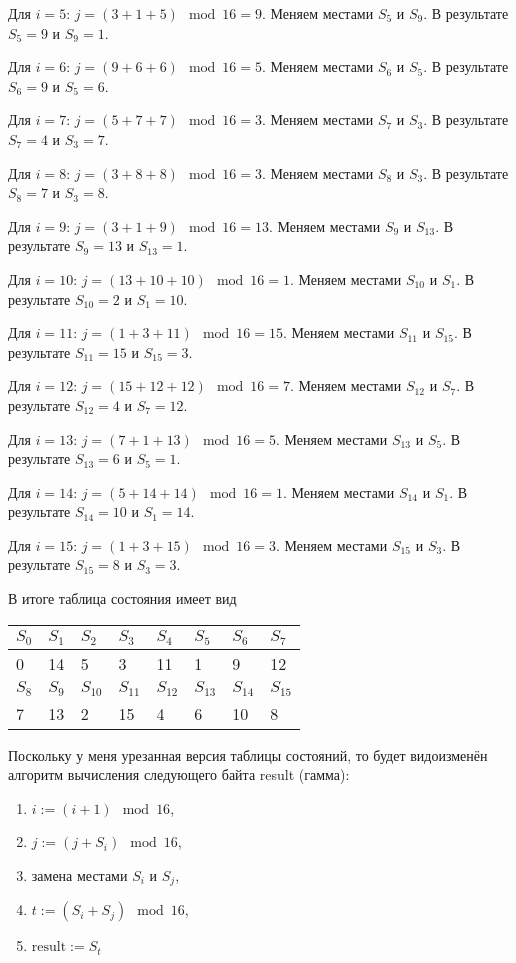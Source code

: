 \documentclass[10pt]{article}
\begin{document}
Для $i = 5$: $j = (3 + 1 + 5) \mod 16 = 9$. Меняем местами $S_5$ и $S_{9}$. В результате $S_5 = 9$ и $S_{9} = 1$.

Для $i = 6$: $j = (9 + 6 + 6) \mod 16 = 5$. Меняем местами $S_6$ и $S_{5}$. В результате $S_6 = 9$ и $S_{5} = 6$.

Для $i = 7$: $j = (5 + 7 + 7) \mod 16 = 3$. Меняем местами $S_7$ и $S_{3}$. В результате $S_7 = 4$ и $S_{3} = 7$.

Для $i = 8$: $j = (3 + 8 + 8) \mod 16 = 3$. Меняем местами $S_8$ и $S_{3}$. В результате $S_8 = 7$ и $S_{3} = 8$.

Для $i = 9$: $j = (3 + 1 + 9) \mod 16 = 13$. Меняем местами $S_9$ и $S_{13}$. В результате $S_9 = 13$ и $S_{13} = 1$.

Для $i = 10$: $j = (13 + 10 + 10) \mod 16 = 1$. Меняем местами $S_{10}$ и $S_{1}$. В результате $S_{10} = 2$ и $S_{1} = 10$.

Для $i = 11$: $j = (1 + 3 + 11) \mod 16 = 15$. Меняем местами $S_{11}$ и $S_{15}$. В результате $S_{11} = 15$ и $S_{15} = 3$.

Для $i = 12$: $j = (15 + 12 + 12) \mod 16 = 7$. Меняем местами $S_{12}$ и $S_{7}$. В результате $S_{12} = 4$ и $S_{7} = 12$.

Для $i = 13$: $j = (7 + 1 + 13) \mod 16 = 5$. Меняем местами $S_{13}$ и $S_{5}$. В результате $S_{13} = 6$ и $S_{5} = 1$.

Для $i = 14$: $j = (5 + 14 + 14) \mod 16 = 1$. Меняем местами $S_{14}$ и $S_{1}$. В результате $S_{14} = 10$ и $S_{1} = 14$.

Для $i = 15$: $j = (1 + 3 + 15) \mod 16 = 3$. Меняем местами $S_{15}$ и $S_{3}$. В результате $S_{15} = 8$ и $S_{3} = 3$.

В итоге таблица состояния имеет вид

\begin{tabular}{l|l|l|l|l|l|l|l}
  $S_0$ & $S_1$ & $S_2$ & $S_3$ & $S_4$ & $S_5$ & $S_6$ & $S_7$ \\ \hline
  0 & 14 & 5 & 3 & 11 & 1 & 9 & 12 \\ \hline
  $S_8$ & $S_9$ & $S_{10}$ & $S_{11}$ & $S_{12}$ & $S_{13}$ & $S_{14}$ & $S_{15}$ \\ \hline
  7 & 13 & 2 & 15 & 4 & 6 & 10 & 8 \\ \hline
\end{tabular}

Поскольку у меня урезанная версия таблицы состояний, то будет видоизменён алгоритм вычисления следующего байта result (гамма):

\begin{enumerate}
\item {$i := (i+1) \mod 16$,}
\item {$j := (j + S_i) \mod 16$,}
\item {замена местами $S_i$ и $S_j$,}
\item {$t := (S_i + S_j ) \mod 16$,}
\item {$\text{result} := S_t$}
\end{enumerate}
\end{document}
